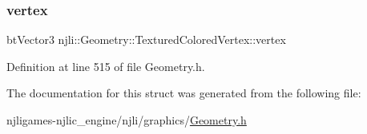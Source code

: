 \subsubsection{\texorpdfstring{vertex}{vertex}}
{\footnotesize\ttfamily bt\+Vector3 njli\+::\+Geometry\+::\+Textured\+Colored\+Vertex\+::vertex}



Definition at line 515 of file Geometry.\+h.



The documentation for this struct was generated from the following file\+:\begin{DoxyCompactItemize}
\item 
njligames-\/njlic\+\_\+engine/njli/graphics/\mbox{\hyperlink{_geometry_8h}{Geometry.\+h}}\end{DoxyCompactItemize}

